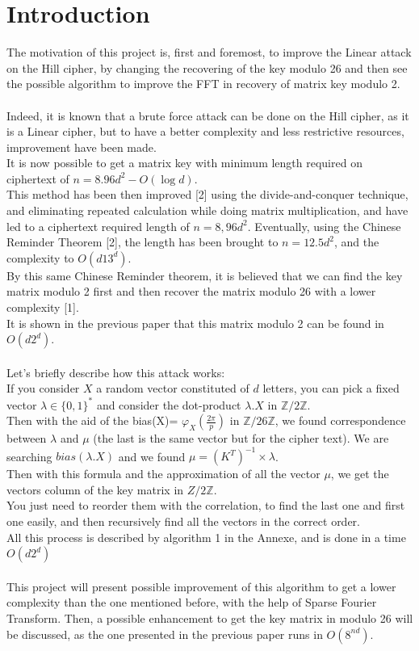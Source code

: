 \documentclass{article}
\begin{document}

\section{Introduction}
The motivation of this project is, first and foremost, to improve the Linear attack on the Hill cipher, by changing the recovering of the key modulo 26 and then see the possible algorithm to improve the FFT in recovery of matrix key modulo 2.\\
\\
Indeed, it is known that a brute force attack can be done on the Hill cipher, as it is a Linear cipher, but to have a better complexity and less restrictive resources, improvement have been made.\\
It is now possible to get a matrix key with minimum length required on ciphertext of $n =8.96d^2 -O(\log d)$.\\
This method has been then improved [2] using the divide-and-conquer technique, and eliminating repeated calculation while doing matrix multiplication, and have led to a ciphertext required length of $n=8,96d^2$. Eventually, using the Chinese Reminder Theorem [2], the length has been brought to $n=12.5d^2$, and the complexity to $O(d13^d)$.\\
By this same Chinese Reminder theorem, it is believed that we can find the key matrix modulo 2 first and then recover the matrix modulo 26 with a lower complexity [1].\\
It is shown in the previous paper that this matrix modulo 2 can be found in $O(d2^d)$.\\
\\
Let's briefly describe how this attack works:\\
If you consider $X$ a random vector constituted of $d$ letters, you can pick a fixed vector $\lambda \in \{0,1\}^*$ and consider the dot-product $\lambda . X$ in $\mathbb{Z}/2\mathbb{Z}$.\\
Then with the aid of the bias(X)= $\varphi_{X}(\frac{2\pi}{p})$ in $\mathbb{Z}/26\mathbb{Z}$, we found correspondence between $\lambda$ and $\mu$ (the last is the same vector but for the cipher text). We are searching $bias(\lambda . X)$ and we found $ \mu = (K^T)^{-1} \times\lambda $.\\
Then with this formula and the approximation of all the vector $\mu$, we get the vectors column of the key matrix in ${Z}/2\mathbb{Z}$.\\
You just need to reorder them with the correlation, to find the last one and first one easily, and then recursively find all the vectors in the correct order.\\
All this process is described by algorithm 1 in the Annexe, and is done in a time $O(d 2^d)$\\
\\
This project will present possible improvement of this algorithm to get a lower complexity than the one mentioned before, with the help of Sparse Fourier Transform. Then, a possible enhancement to get the key matrix in modulo 26 will be discussed, as the one presented in the previous paper runs in $O(8^{nd})$.\\
\end{document}
